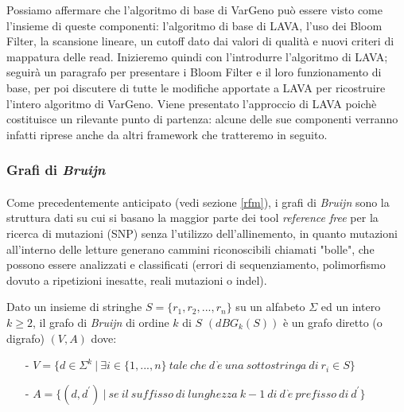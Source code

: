 \documentclass[../main.tex]{subfiles}
\begin{document}
Possiamo affermare che l’algoritmo di base di VarGeno può essere visto come l’insieme di queste componenti: l’algoritmo di base di LAVA, l’uso dei Bloom Filter, la scansione lineare, un cutoff dato dai valori di qualità e nuovi criteri di mappatura delle read. Inizieremo quindi con l’introdurre l’algoritmo di LAVA; seguirà un paragrafo per presentare i Bloom Filter e il loro funzionamento di base, per poi discutere di tutte le modifiche apportate a LAVA per ricostruire l’intero algoritmo di VarGeno. Viene presentato l'approccio di LAVA poichè costituisce un rilevante punto di partenza: alcune delle sue componenti verranno infatti riprese anche da altri framework che tratteremo in seguito.

\subsubsection{Grafi di \textit{Bruijn}}
\label{dBG}
\theoremstyle{definition}
\paragraph{}Come precedentemente anticipato (vedi sezione \ref{rfm}), i grafi di \textit{Bruijn} sono la struttura dati su cui si basano la maggior parte dei tool \textit{reference free} per la  ricerca di mutazioni (SNP) senza l'utilizzo dell'allinemento, in quanto mutazioni all'interno delle letture generano cammini riconoscibili chiamati "bolle", che possono essere analizzati e classificati (errori di sequenziamento, polimorfismo dovuto a ripetizioni inesatte, reali mutazioni o indel).

\begin{definition} 

Dato un insieme di stringhe $S = \{r_1 , r_2 , ... , r_n\}$ su un alfabeto $\Sigma$ ed un intero $k\geq2$, il grafo di \textit{Bruijn} di ordine $k$ di $S$ $(dBG_k (S))$ è un grafo diretto (o digrafo) $(V,A)$ dove:

\begin{itemize}
\item[-] $V = \{d \in \Sigma^k \ |\  \exists i \in \{1, ..., n\} \ tale\ che\ d\ \grave{e}\ una\ sottostringa\ di\ r_i \in S\}$
\item[-]$A = \{ (d,d^\prime)\ |\ se\ il\ suffisso\ di\ lunghezza\ k-1\ di\ d\ \grave{e}\ prefisso\ di\ d^\prime\}$
\end{itemize}

\end{definition}
\end{document}
